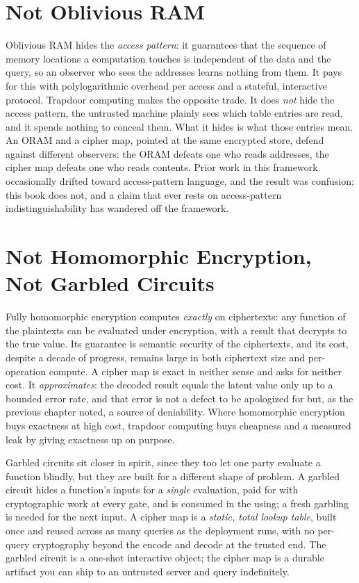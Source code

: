\section{Not Oblivious RAM}
\label{sec:not-oram}

Oblivious RAM hides the \emph{access pattern}: it guarantees that the
sequence of memory locations a computation touches is independent of the
data and the query, so an observer who sees the addresses learns nothing
from them. It pays for this with polylogarithmic overhead per access and a
stateful, interactive protocol. Trapdoor computing makes the opposite
trade. It does \emph{not} hide the access pattern, the untrusted machine
plainly sees which table entries are read, and it spends nothing to conceal
them. What it hides is what those entries mean. An ORAM and a cipher map,
pointed at the same encrypted store, defend against different observers: the
ORAM defeats one who reads addresses, the cipher map defeats one who reads
contents. Prior work in this framework occasionally drifted toward
access-pattern language, and the result was confusion; this book does not,
and a claim that ever rests on access-pattern indistinguishability has
wandered off the framework.

\section{Not Homomorphic Encryption, Not Garbled Circuits}
\label{sec:not-fhe}

Fully homomorphic encryption computes \emph{exactly} on ciphertexts: any
function of the plaintexts can be evaluated under encryption, with a result
that decrypts to the true value. Its guarantee is semantic security of the
ciphertexts, and its cost, despite a decade of progress, remains large in
both ciphertext size and per-operation compute. A cipher map is exact in
neither sense and asks for neither cost. It \emph{approximates}: the
decoded result equals the latent value only up to a bounded error rate, and
that error is not a defect to be apologized for but, as the previous
chapter noted, a source of deniability. Where homomorphic encryption buys
exactness at high cost, trapdoor computing buys cheapness and a measured
leak by giving exactness up on purpose.

Garbled circuits sit closer in spirit, since they too let one party
evaluate a function blindly, but they are built for a different shape of
problem. A garbled circuit hides a function's inputs for a \emph{single}
evaluation, paid for with cryptographic work at every gate, and is consumed
in the using; a fresh garbling is needed for the next input. A cipher map
is a \emph{static, total lookup table}, built once and reused across as
many queries as the deployment runs, with no per-query cryptography beyond
the encode and decode at the trusted end. The garbled circuit is a
one-shot interactive object; the cipher map is a durable artifact you can
ship to an untrusted server and query indefinitely.

